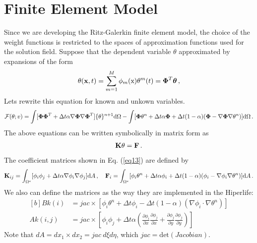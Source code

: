\documentclass[]{article}
\begin{document}
\section{Finite Element Model} \label{sec: fem}
Since we are developing the Ritz-Galerkin finite element model, the choice of the weight functions is restricted to the spaces of approximation functions used for the solution field. Suppose that the dependent variable $\theta$ approximated by expansions of the form
\begin{equation}\label{eq11}
	\begin{aligned}
		\theta(\mathbf{x}, t)= \sum_{m=1}^{M} \phi_m(\mathrm{x}) \mathbf{\theta}^m(t) = \boldsymbol{\Phi}^T\boldsymbol{\theta} \thinspace,
	\end{aligned}
\end{equation}
Lets rewrite this equation for known and unkown variables.
\begin{equation}\label{eq12}
	\begin{aligned}[b]
		\mathcal{F}(\theta; v)=\int [\boldsymbol{\Phi}\boldsymbol{\Phi}^T + \Delta t \alpha\nabla\boldsymbol{\Phi}\nabla\boldsymbol{\Phi}^T]\{\theta\}^{n+1} \mathrm{d} \Omega - \int  [\boldsymbol{\Phi}\theta^{n}+\Delta t \alpha \boldsymbol{\Phi} + \Delta t (1-\alpha) (\boldsymbol{\Phi} - \nabla \boldsymbol{\Phi} \nabla\theta^n)]\mathrm{d} \Omega\thinspace.
	\end{aligned}
\end{equation}
The above equations can be written symbolically in matrix form as
\begin{equation}\label{eq13}
	\begin{aligned}
		\mathbf{K}\mathbf{\theta} = \mathbf{F}\thinspace.
	\end{aligned}
\end{equation}
The coefficient matrices shown in Eq. (\ref{eq13}) are defined by
\begin{equation}\label{eq14}
	\begin{aligned}
		\mathbf{K}_{ij} = \int_{\Omega^e} [\phi_i\phi_j + \Delta t \alpha\nabla\phi_i\nabla\phi_j]\mathrm{d}A\thinspace, \quad
		\mathbf{F}_i =\int_{\Omega^e} [\phi_i\theta^{n}+\Delta t \alpha \phi_i + \Delta t (1-\alpha) (\phi_i - \nabla \phi_i \nabla\theta^n)]\mathrm{d}A \thinspace.
	\end{aligned}
\end{equation}
We also can define the matrices as the way they are implemented in the Hiperlife:
\begin{equation}\label{eq15}
	\begin{aligned}[b]
		Bk (i) &= jac \times [\phi_i \theta^n + \Delta t  \phi_i - \Delta t (1-\alpha)(\nabla \phi_i \cdot \nabla \theta^n)] \\
		Ak (i,j) &=  jac \times [\phi_i\phi_j + \Delta t \alpha(\frac{\partial \phi_i}{\partial x}
		\frac{\partial \phi_j}{\partial x} + \frac{\partial \phi_j}{\partial y} 
		\frac{\partial \phi_j}{\partial y})]  
	\end{aligned}
\end{equation}
Note that $dA=dx_{1} \times dx_{2}=jac \ d\xi d\eta$, which $jac=\mathrm{det}(Jacobian)$.
\end{document}

